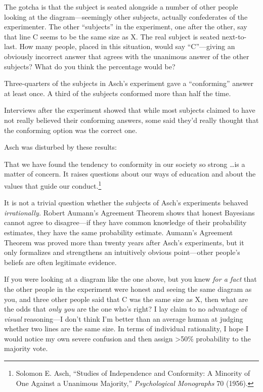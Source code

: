 {
 The gotcha is that the subject is seated alongside a number of
other people looking at the diagram---seemingly other subjects,
actually confederates of the experimenter. The other
``subjects'' in the experiment, one
after the other, say that line C seems to be the same size as X. The
real subject is seated next-to-last. How many people, placed in this
situation, would say ``C''---giving
an obviously incorrect answer that agrees with the unanimous answer of
the other subjects? What do you think the percentage would be?}

{
 Three-quarters of the subjects in Asch's
experiment gave a ``conforming''
answer at least once. A third of the subjects conformed more than half
the time.}

{
 Interviews after the experiment showed that while most subjects
claimed to have not really believed their conforming answers, some said
they'd really thought that the conforming option was
the correct one.}

{
 Asch was disturbed by these results:}

{
 That we have found the tendency to conformity in our society so
strong \ldots is a matter of concern. It raises questions about our ways
of education and about the values that guide our
conduct.\footnote{Solomon E. Asch, ``Studies of Independence and
Conformity: A Minority of One Against a Unanimous
Majority,'' \textit{Psychological Monographs} 70
(1956).}}

{
 It is not a trivial question whether the subjects of
Asch's experiments behaved \textit{irrationally.}
Robert Aumann's Agreement Theorem shows that honest
Bayesians cannot agree to disagree---if they have common knowledge of
their probability estimates, they have the same probability estimate.
Aumann's Agreement Theorem was proved more than twenty
years after Asch's experiments, but it only formalizes
and strengthens an intuitively obvious point---other
people's beliefs are often legitimate evidence.}

{
 If you were looking at a diagram like the one above, but you knew
\textit{for a fact} that the other people in the experiment were honest
and seeing the same diagram as you, and three other people said that C
was the same size as X, then what are the odds that \textit{only you}
are the one who's right? I lay claim to no advantage of
\textit{visual} reasoning---I don't think
I'm better than an average human at judging whether two
lines are the same size. In terms of individual rationality, I hope I
would notice my own severe confusion and then assign {\textgreater}50\%
probability to the majority vote.}

